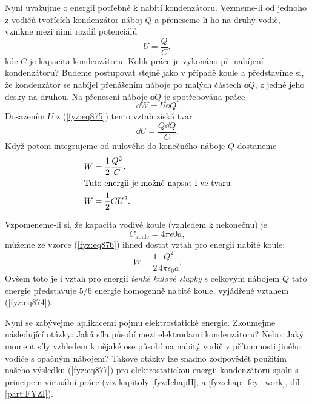     Nyní uvažujme o energii potřebné k nabití kondenzátoru. Vezmeme-li od jednoho z vodičů tvořících
    kondenzátor náboj \(Q\) a přeneseme-li ho na druhý vodič, vznikne mezi nimi rozdíl potenciálů
    \begin{equation}\label{fyz:eq875}
      U = \dfrac{Q}{C},
    \end{equation}
    kde \(C\) je kapacita kondenzátoru. Kolik práce je vykonáno při nabíjení kondenzátoru? Budeme
    postupovat stejně jako v případě koule a představíme si, že kondenzátor se nabíjel přenášením
    náboje po malých částech \(\dd{Q}\), z jedné jeho desky na druhou. Na přenesení náboje
    \(\dd{Q}\) je spotřebována práce
    \begin{equation*}
      \dd{W} = U\dd{Q}.
    \end{equation*}
    Dosazením \(U\) z (\ref{fyz:eq875}) tento vztah získá tvar
    \begin{equation*}
      \dd{U} = \dfrac{Q\dd{Q}}{C}.
    \end{equation*}
    Když potom integrujeme od nulového do konečného náboje \(Q\) dostaneme
    \begin{align}
      W &= \dfrac{1}{2}\dfrac{Q^2}{C}.  \label{fyz:eq876}     \\
      \shortintertext{Tuto energii je možné napsat i ve tvaru}
      W &= \dfrac{1}{2}CU^2.            \label{fyz:eq877}
    \end{align} 

    Vzpomeneme-li si, že kapacita vodivé koule (vzhledem k nekonečnu) je
    \begin{equation*}
      C_{\text{koule}} = 4πϵ0a,
    \end{equation*}
    můžeme ze vzorce (\ref{fyz:eq876}) ihned dostat vztah pro energii nabité koule:
    \begin{equation}\label{fyz:eq878}
      W=\dfrac{1}{2}\dfrac{Q^2}{4πϵ_0a}.
    \end{equation}
    Ovšem toto je i vztah pro energii \emph{tenké kulové slupky} s celkovým nábojem \(Q\) tato
    energie představuje \(5/6\) energie homogenně nabité koule, vyjádřené vztahem (\ref{fyz:eq874}).

    Nyní se zabývejme aplikacemi pojmu elektrostatické energie. Zkoumejme následující otázky: Jaká
    síla působí mezi elektrodami kondenzátoru? Nebo: Jaký moment síly vzhledem k nějaké ose působí
    na nabitý vodič v přítomnosti jiného vodiče s opačným nábojem? Takové otázky lze snadno
    zodpovědět použitím našeho výsledku (\ref{fyz:eq877}) pro elektrostatickou energii kondenzátoru
    spolu s principem virtuální práce (viz kapitoly \ref{fyz:IchapII}, a \ref{fyz:chap_fey_work},
    díl \ref{part:FYZI}).

